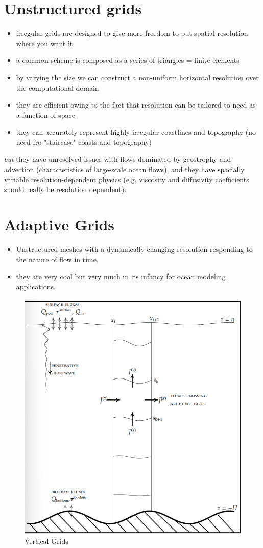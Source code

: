 \section{Unstructured grids}
\begin{itemize}
	\item irregular grids are designed to give more freedom to put spatial resolution where you want it
	\item a common scheme is composed as a series of triangles = finite elements
	\item by varying the size we can construct a non-uniform horizontal resolution over the computational domain
	\item they are efficient owing to the fact that resolution can be tailored to need as a function of space
	\item they can accurately represent highly irregular coastlines and topography (no need fro "staircase" coasts and topography)
\end{itemize}
\textit{but} they have unresolved issues with flows dominated by geostrophy and advection (characteristics of large-scale ocean flows), and they have spacially variable resolution-dependent physics (e.g. viscosity and diffusivity coefficients should really be resolution dependent).

\section{Adaptive Grids}
\begin{itemize}
	\item Unstructured meshes with a dynamically changing resolution responding to the nature of flow in time,
	\item they are very cool but very much in its infancy for ocean modeling applications.
\end{itemize}
\begin{figure}[htp!]
	\centering
	\includegraphics[width=0.40\linewidth]{uploads/Screenshot 2024-11-21 235405.png}
	\caption{Vertical Grids}
	\label{fig:vertical grids}
\end{figure}

